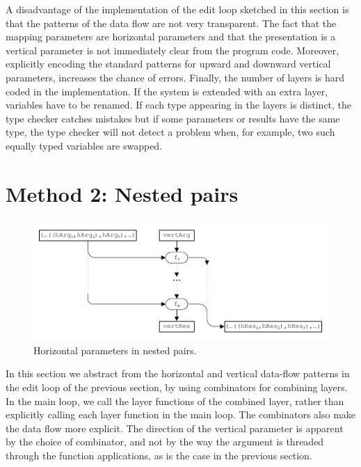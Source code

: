 \documentclass[preprint,natbib]{sigplanconf}
\begin{document}
A disadvantage of the implementation of the edit loop sketched in this section is that the patterns of the data flow are not very transparent. The fact that the mapping parameters are horizontal parameters and that the presentation is a vertical parameter is not immediately clear from the program code. Moreover, explicitly encoding the standard patterns for upward and downward vertical parameters, increases the chance of errors. Finally, the number of layers is hard coded in the implementation. If the system is extended with an extra layer, variables have to be renamed. If each type appearing in the layers is distinct, the type checker catches mistakes but if some parameters or results have the same type, the type checker will not detect a problem when, for example, two such equally typed variables are swapped. 



%																
%																
%																
\section{Method 2: Nested pairs}\label{sect:ncp}

\begin{figure}
\includegraphics[width=\columnwidth]{images/NestedPairs}
\caption{Horizontal parameters in nested pairs.}\label{ncp} 
\end{figure}


In this section we abstract from the horizontal and vertical data-flow patterns in the edit loop of the previous section, by using combinators for combining layers. In the main loop, we call the layer functions of the combined layer, rather than explicitly calling each layer function in the main loop. The combinators also make the data flow more explicit. The direction of the vertical parameter is apparent by the choice of   combinator, and not by the way the argument is threaded through the function applications, as is the case in the previous section. 
\end{document}
